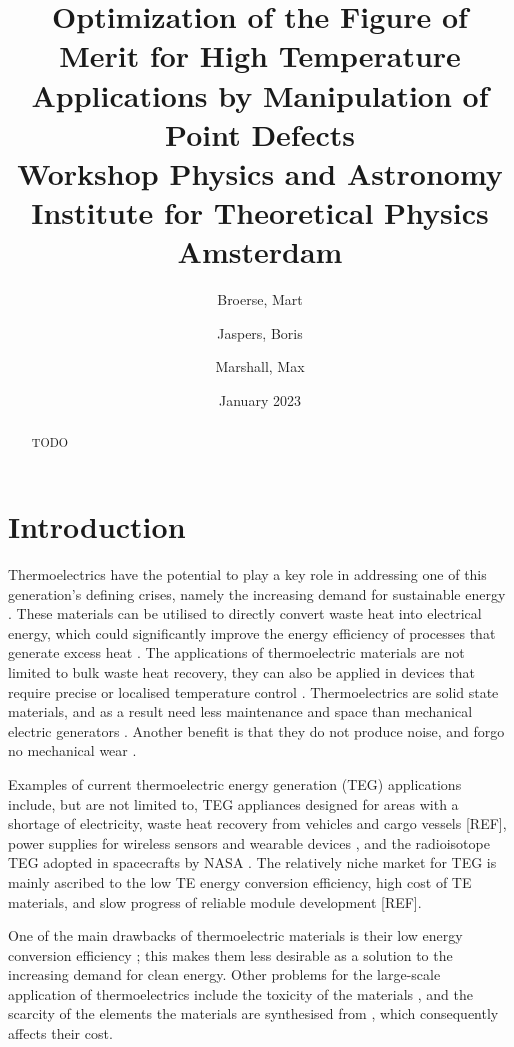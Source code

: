 \documentclass[12pt]{article}
\author{
	Broerse, Mart\\
	\and
	Jaspers, Boris\\
	\and
	Marshall, Max
}
\title{%
  Optimization of the Figure of Merit for High Temperature Applications by Manipulation of Point Defects \\
  \large Workshop Physics and Astronomy \\ Institute for Theoretical Physics Amsterdam}
\date{January 2023}
\theoremstyle{plain}
\theoremstyle{definition}
\newcommand{\<}{\langle}
\renewcommand{\>}{\rangle}
\begin{document}
\maketitle

\begin{abstract}
TODO
\end{abstract}

\section{Introduction}

Thermoelectrics have the potential to play a key role in addressing one of this generation's defining crises, namely the increasing demand for sustainable energy \cite{Wang2021}. These materials can be utilised to directly convert waste heat into electrical energy, which could significantly improve the energy efficiency of processes that generate excess heat \cite{Wang2021}.
The applications of thermoelectric materials are not limited to bulk waste heat recovery, they can also be applied in devices that require precise or localised temperature control \cite{1616249}.
Thermoelectrics are solid state materials, and as a result need less maintenance and space than mechanical electric generators \cite{SnyderGJeffrey2008Ctm}.
Another benefit is that they do not produce noise, and forgo no mechanical wear \cite{SnyderGJeffrey2008Ctm}.

Examples of current thermoelectric energy generation (TEG) applications include, but are not limited to, TEG appliances designed for areas with a shortage of electricity, waste heat recovery from vehicles and cargo vessels [REF], power supplies for wireless sensors and wearable devices \cite{10.4108/icst.bodynets.2014.257119}, and the radioisotope TEG adopted in spacecrafts by NASA \cite{doi:10.2514/6.2005-5713}.  
The relatively niche market for TEG is mainly ascribed to the low TE energy conversion efficiency, high cost of TE materials, and slow progress of reliable module development [REF].

One of the main drawbacks of thermoelectric materials is their low energy conversion efficiency \cite{SnyderGJeffrey2008Ctm}; this makes them less desirable as a solution to the increasing demand for clean energy.
Other problems for the large-scale application of thermoelectrics include the toxicity of the materials \cite{LiuWei2017Ehst}, and the scarcity of the elements the materials are synthesised from \cite{LiuWei2017Ehst}, which consequently affects their cost.
\end{document}
